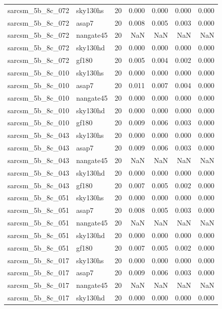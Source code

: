 \begin{tabular}{llrrrrr}
sarcsm\_5b\_8c\_072 & sky130hs & 20 & 0.000 & 0.000 & 0.000 & 0.000 \\
sarcsm\_5b\_8c\_072 & asap7 & 20 & 0.008 & 0.005 & 0.003 & 0.000 \\
sarcsm\_5b\_8c\_072 & nangate45 & 20 & NaN & NaN & NaN & NaN \\
sarcsm\_5b\_8c\_072 & sky130hd & 20 & 0.000 & 0.000 & 0.000 & 0.000 \\
sarcsm\_5b\_8c\_072 & gf180 & 20 & 0.005 & 0.004 & 0.002 & 0.000 \\
sarcsm\_5b\_8c\_010 & sky130hs & 20 & 0.000 & 0.000 & 0.000 & 0.000 \\
sarcsm\_5b\_8c\_010 & asap7 & 20 & 0.011 & 0.007 & 0.004 & 0.000 \\
sarcsm\_5b\_8c\_010 & nangate45 & 20 & 0.000 & 0.000 & 0.000 & 0.000 \\
sarcsm\_5b\_8c\_010 & sky130hd & 20 & 0.000 & 0.000 & 0.000 & 0.000 \\
sarcsm\_5b\_8c\_010 & gf180 & 20 & 0.009 & 0.006 & 0.003 & 0.000 \\
sarcsm\_5b\_8c\_043 & sky130hs & 20 & 0.000 & 0.000 & 0.000 & 0.000 \\
sarcsm\_5b\_8c\_043 & asap7 & 20 & 0.009 & 0.006 & 0.003 & 0.000 \\
sarcsm\_5b\_8c\_043 & nangate45 & 20 & NaN & NaN & NaN & NaN \\
sarcsm\_5b\_8c\_043 & sky130hd & 20 & 0.000 & 0.000 & 0.000 & 0.000 \\
sarcsm\_5b\_8c\_043 & gf180 & 20 & 0.007 & 0.005 & 0.002 & 0.000 \\
sarcsm\_5b\_8c\_051 & sky130hs & 20 & 0.000 & 0.000 & 0.000 & 0.000 \\
sarcsm\_5b\_8c\_051 & asap7 & 20 & 0.008 & 0.005 & 0.003 & 0.000 \\
sarcsm\_5b\_8c\_051 & nangate45 & 20 & NaN & NaN & NaN & NaN \\
sarcsm\_5b\_8c\_051 & sky130hd & 20 & 0.000 & 0.000 & 0.000 & 0.000 \\
sarcsm\_5b\_8c\_051 & gf180 & 20 & 0.007 & 0.005 & 0.002 & 0.000 \\
sarcsm\_5b\_8c\_017 & sky130hs & 20 & 0.000 & 0.000 & 0.000 & 0.000 \\
sarcsm\_5b\_8c\_017 & asap7 & 20 & 0.009 & 0.006 & 0.003 & 0.000 \\
sarcsm\_5b\_8c\_017 & nangate45 & 20 & NaN & NaN & NaN & NaN \\
sarcsm\_5b\_8c\_017 & sky130hd & 20 & 0.000 & 0.000 & 0.000 & 0.000 \\

\end{tabular}
